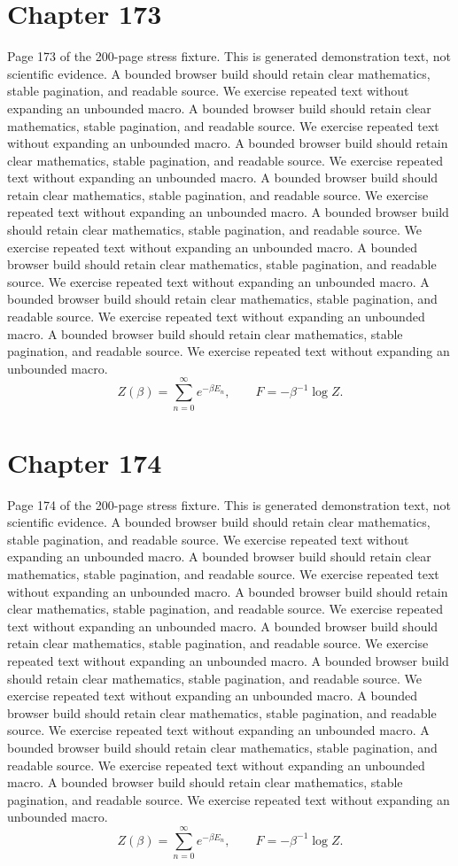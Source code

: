 \documentclass[11pt]{article}
\begin{document}
\section*{Chapter 173}
Page 173 of the 200-page stress fixture. This is generated demonstration text, not scientific evidence.
A bounded browser build should retain clear mathematics, stable pagination, and readable source. We exercise repeated text without expanding an unbounded macro.
A bounded browser build should retain clear mathematics, stable pagination, and readable source. We exercise repeated text without expanding an unbounded macro.
A bounded browser build should retain clear mathematics, stable pagination, and readable source. We exercise repeated text without expanding an unbounded macro.
A bounded browser build should retain clear mathematics, stable pagination, and readable source. We exercise repeated text without expanding an unbounded macro.
A bounded browser build should retain clear mathematics, stable pagination, and readable source. We exercise repeated text without expanding an unbounded macro.
A bounded browser build should retain clear mathematics, stable pagination, and readable source. We exercise repeated text without expanding an unbounded macro.
A bounded browser build should retain clear mathematics, stable pagination, and readable source. We exercise repeated text without expanding an unbounded macro.
A bounded browser build should retain clear mathematics, stable pagination, and readable source. We exercise repeated text without expanding an unbounded macro.
\[Z(\beta)=\sum_{n=0}^{\infty}e^{-\beta E_n},\qquad F=-\beta^{-1}\log Z.\]
\newpage
\section*{Chapter 174}
Page 174 of the 200-page stress fixture. This is generated demonstration text, not scientific evidence.
A bounded browser build should retain clear mathematics, stable pagination, and readable source. We exercise repeated text without expanding an unbounded macro.
A bounded browser build should retain clear mathematics, stable pagination, and readable source. We exercise repeated text without expanding an unbounded macro.
A bounded browser build should retain clear mathematics, stable pagination, and readable source. We exercise repeated text without expanding an unbounded macro.
A bounded browser build should retain clear mathematics, stable pagination, and readable source. We exercise repeated text without expanding an unbounded macro.
A bounded browser build should retain clear mathematics, stable pagination, and readable source. We exercise repeated text without expanding an unbounded macro.
A bounded browser build should retain clear mathematics, stable pagination, and readable source. We exercise repeated text without expanding an unbounded macro.
A bounded browser build should retain clear mathematics, stable pagination, and readable source. We exercise repeated text without expanding an unbounded macro.
A bounded browser build should retain clear mathematics, stable pagination, and readable source. We exercise repeated text without expanding an unbounded macro.
\[Z(\beta)=\sum_{n=0}^{\infty}e^{-\beta E_n},\qquad F=-\beta^{-1}\log Z.\]
\newpage
\end{document}

